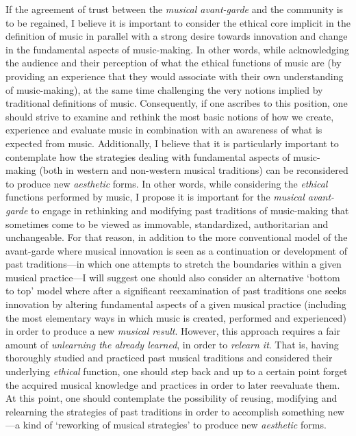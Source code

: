 If the agreement of trust between the \emph{musical avant-garde} and the community is to be regained, I believe it is important to consider the ethical core implicit in the definition of music in parallel with a strong desire towards innovation and change in the fundamental aspects of music-making. In other words, while acknowledging the audience and their perception of what the ethical functions of music are (by providing an experience that they would associate with their own understanding of music-making), at the same time challenging the very notions implied by traditional definitions of music. Consequently, if one ascribes to this position, one should strive to examine and rethink the most basic notions of how we create, experience and evaluate music in combination with an awareness of what is expected from music. Additionally, I believe that it is particularly important to contemplate how the strategies dealing with fundamental aspects of music-making (both in western and non-western musical traditions) can be reconsidered to produce new \emph{aesthetic} forms. In other words, while considering the \emph{ethical} functions performed by music, I propose it is important for the \emph{musical avant-garde} to engage in rethinking and modifying past traditions of music-making that sometimes come to be viewed as immovable, standardized, authoritarian and unchangeable. For that reason, in addition to the more conventional model of the avant-garde where musical innovation is seen as a continuation or development of past traditions---in which one attempts to stretch the boundaries within a given musical practice---I will suggest one should also consider an alternative `bottom to top' model where after a significant reexamination of past traditions one seeks innovation by altering fundamental aspects of a given musical practice (including the most elementary ways in which music is created, performed and experienced) in order to produce a new \emph{musical result}. However, this approach requires a fair amount of \emph{unlearning the already learned}, in order to \emph{relearn it}. That is, having thoroughly studied and practiced past musical traditions and considered their underlying \emph{ethical} function, one should step back and up to a certain point forget the acquired musical knowledge and practices in order to later reevaluate them. At this point, one should contemplate the possibility of reusing, modifying and relearning the strategies of past traditions in order to accomplish something new---a kind of `reworking of musical strategies' to produce new \emph{aesthetic} forms. 

